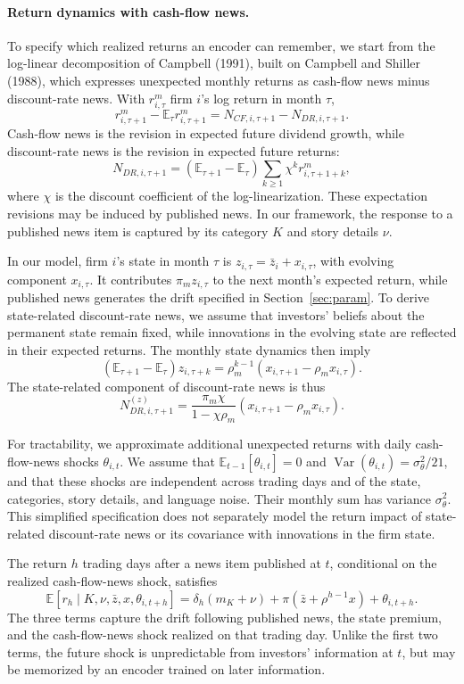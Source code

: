 \documentclass[11pt,letterpaper]{article}
\theoremstyle{remark}
\DeclareMathOperator{\Var}{Var}
\begin{document}
\paragraph{Return dynamics with cash-flow news.}
To specify which realized returns an encoder can remember, we start from the log-linear decomposition of Campbell (1991), built on Campbell and Shiller (1988), which expresses unexpected monthly returns as cash-flow news minus discount-rate news. With $r^m_{i,\tau}$ firm $i$'s log return in month $\tau$,
\[
r^m_{i,\tau+1}-\mathbb E_\tau r^m_{i,\tau+1}
=N_{CF,i,\tau+1}-N_{DR,i,\tau+1}.
\]
Cash-flow news is the revision in expected future dividend growth, while discount-rate news is the revision in expected future returns:
\[
N_{DR,i,\tau+1}
=(\mathbb E_{\tau+1}-\mathbb E_\tau)\sum_{k\ge1}\chi^k r^m_{i,\tau+1+k},
\]
where $\chi$ is the discount coefficient of the log-linearization. These expectation revisions may be induced by published news. In our framework, the response to a published news item is captured by its category $K$ and story details $\nu$.

In our model, firm $i$'s state in month $\tau$ is $z_{i,\tau}=\bar z_i+x_{i,\tau}$, with evolving component $x_{i,\tau}$. It contributes $\pi_m z_{i,\tau}$ to the next month's expected return, while published news generates the drift specified in Section~\ref{sec:param}. To derive state-related discount-rate news, we assume that investors' beliefs about the permanent state remain fixed, while innovations in the evolving state are reflected in their expected returns. The monthly state dynamics then imply
\[
(\mathbb E_{\tau+1}-\mathbb E_\tau)z_{i,\tau+k}
=\rho_m^{k-1}(x_{i,\tau+1}-\rho_m x_{i,\tau}).
\]
The state-related component of discount-rate news is thus
\[
N_{DR,i,\tau+1}^{(z)}
=\frac{\pi_m\chi}{1-\chi\rho_m}(x_{i,\tau+1}-\rho_m x_{i,\tau}).
\]

For tractability, we approximate additional unexpected returns with daily cash-flow-news shocks $\theta_{i,t}$. We assume that $\mathbb E_{t-1}[\theta_{i,t}]=0$ and $\Var(\theta_{i,t})=\sigma_\theta^2/21$, and that these shocks are independent across trading days and of the state, categories, story details, and language noise. Their monthly sum has variance $\sigma_\theta^2$. This simplified specification does not separately model the return impact of state-related discount-rate news or its covariance with innovations in the firm state.

The return $h$ trading days after a news item published at $t$, conditional on the realized cash-flow-news shock, satisfies
\begin{equation}\label{eq:D22}
\mathbb E[r_h\mid K,\nu,\bar z,x,\theta_{i,t+h}]
=\delta_h(m_K+\nu)+\pi(\bar z+\rho^{h-1}x)+\theta_{i,t+h}.
\end{equation}
The three terms capture the drift following published news, the state premium, and the cash-flow-news shock realized on that trading day. Unlike the first two terms, the future shock is unpredictable from investors' information at $t$, but may be memorized by an encoder trained on later information.
\end{document}

